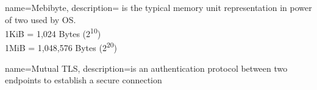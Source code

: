 

{
  name=Mebibyte,
  description={
    is the typical memory unit representation in power of two used by OS. \\
    1KiB = 1,024 Bytes (2\textsuperscript{10}) \\
    1MiB = 1,048,576 Bytes (2\textsuperscript{20})
  }
}

{
  name=Mutual TLS,
  description={is an authentication protocol between two endpoints to establish a secure connection}
}
